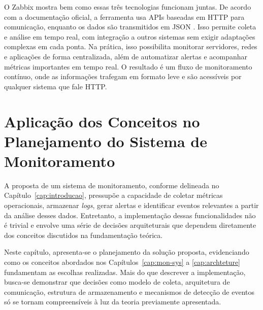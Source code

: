 \documentclass[
    12pt
    ,oneside
    ,a4paper
    ,chapter=TITLE
    ,section=TITLE
    ,sumario=abnt-6027-2012]{abntex2}
\begin{document}
O Zabbix mostra bem como essas três tecnologias funcionam juntas. De acordo com a documentação oficial, a ferramenta usa APIs baseadas em HTTP para comunicação, enquanto os dados são transmitidos em JSON \cite{zabbix}. Isso permite coleta e análise em tempo real, com integração a outros sistemas sem exigir adaptações complexas em cada ponta. Na prática, isso possibilita monitorar servidores, redes e aplicações de forma centralizada, além de automatizar alertas e acompanhar métricas importantes em tempo real. O resultado é um fluxo de monitoramento contínuo, onde as informações trafegam em formato leve e são acessíveis por qualquer sistema que fale HTTP.



\chapter{Aplicação dos Conceitos no Planejamento do Sistema de Monitoramento}
\label{cap:plan}

A proposta de um sistema de monitoramento, conforme delineada no Capítulo~\ref{cap:introducao}, pressupõe a capacidade de coletar métricas operacionais, armazenar \textit{logs}, gerar alertas e identificar eventos relevantes a partir da análise desses dados. Entretanto, a implementação dessas funcionalidades não é trivial e envolve uma série de decisões arquiteturais que dependem diretamente dos conceitos discutidos na fundamentação teórica.

Neste capítulo, apresenta-se o planejamento da solução proposta, evidenciando como os conceitos abordados nos Capítulos~\ref{cap:mon-sys} a \ref{cap:archteture} fundamentam as escolhas realizadas. Mais do que descrever a implementação, busca-se demonstrar que decisões como modelo de coleta, arquitetura de comunicação, estrutura de armazenamento e mecanismos de detecção de eventos só se tornam compreensíveis à luz da teoria previamente apresentada.
\end{document}
